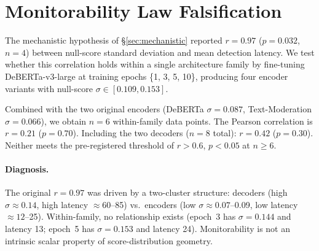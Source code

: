 
\section{Monitorability Law Falsification}
\label{app:monitorability}

The mechanistic hypothesis of \S\ref{sec:mechanistic} reported $r = 0.97$ ($p = 0.032$, $n = 4$) between null-score standard deviation and mean detection latency. We test whether this correlation holds within a single architecture family by fine-tuning DeBERTa-v3-large at training epochs \{1, 3, 5, 10\}, producing four encoder variants with null-score $\sigma \in [0.109, 0.153]$.

Combined with the two original encoders (DeBERTa $\sigma = 0.087$, Text-Moderation $\sigma = 0.066$), we obtain $n = 6$ within-family data points. The Pearson correlation is $r = 0.21$ ($p = 0.70$). Including the two decoders ($n = 8$ total): $r = 0.42$ ($p = 0.30$). Neither meets the pre-registered threshold of $r > 0.6$, $p < 0.05$ at $n \geq 6$.

\paragraph{Diagnosis.} The original $r = 0.97$ was driven by a two-cluster structure: decoders (high $\sigma \approx 0.14$, high latency $\approx 60$--85) vs.\ encoders (low $\sigma \approx 0.07$--0.09, low latency $\approx 12$--25). Within-family, no relationship exists (epoch~3 has $\sigma = 0.144$ and latency 13; epoch~5 has $\sigma = 0.153$ and latency 24). Monitorability is not an intrinsic scalar property of score-distribution geometry.
